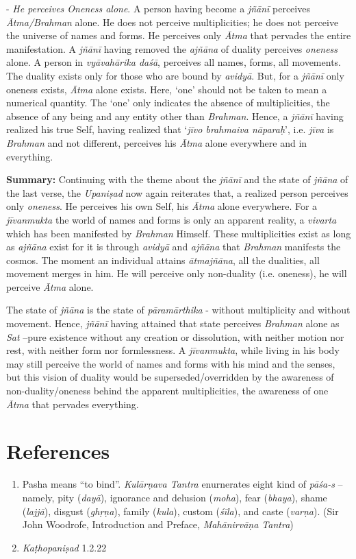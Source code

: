 - \emph{He perceives Oneness alone}. A person having become a \emph{jñānī} perceives \emph{Ātma/Brahman} alone. He does not perceive multiplicities; he does not perceive the universe of names and forms. He perceives only \emph{Ātma} that pervades the entire manifestation. A \emph{jñānī} having removed the \emph{ajñāna} of duality perceives \emph{oneness} alone. A person in \emph{vyāvahārika daśā}, perceives all names, forms, all movements. The duality exists only for those who are bound by \emph{avidyā}. But, for a \emph{jñānī} only oneness exists, \emph{Ātma} alone exists. Here, `one' should not be taken to mean a numerical quantity. The `one' only indicates the absence of multiplicities, the absence of any being and any entity other than \emph{Brahman}. Hence, a \emph{jñānī} having realized his true Self, having realized that `\emph{jīvo brahmaiva nāparaḥ}', i.e. \emph{jīva} is \emph{Brahman} and not different, perceives his \emph{Ātma} alone everywhere and in everything.

\textbf{Summary:} Continuing with the theme about the \emph{jñānī} and the state of \emph{jñāna} of the last verse, the \emph{Upaniṣad} now again reiterates that, a realized person perceives only \emph{oneness}. He perceives his own Self, his \emph{Ātma} alone everywhere. For a \emph{jīvanmukta} the world of names and forms is only an apparent reality, a \emph{vivarta} which has been manifested by \emph{Brahman} Himself. These multiplicities exist as long as \emph{ajñāna} exist for it is through \emph{avidyā} and \emph{ajñāna} that \emph{Brahman} manifests the cosmos. The moment an individual attains \emph{ātmajñāna}, all the dualities, all movement merges in him. He will perceive only non-duality (i.e. oneness), he will perceive \emph{Ātma} alone.

The state of \emph{jñāna} is the state of \emph{pāramārthika} - without multiplicity and without movement. Hence, \emph{jñānī} having attained that state perceives \emph{Brahman} alone as \emph{Sat} --pure existence without any creation or dissolution, with neither motion nor rest, with neither form nor formlessness. A \emph{jīvanmukta}, while living in his body may still perceive the world of names and forms with his mind and the senses, but this vision of duality would be superseded/overridden by the awareness of non-duality/oneness behind the apparent multiplicities, the awareness of one \emph{Ātma} that pervades everything.

\section*{References}

\begin{enumerate}
\itemsep=0pt
\item
  Pasha means ``to bind''. \emph{Kulārṇava Tantra} enurnerates eight kind of \emph{pāśa-s} -- namely, pity (\emph{dayā}), ignorance and delusion (\emph{moha}), fear (\emph{bhaya}), shame (\emph{lajjā}), disgust (\emph{ghṛṇa}), family (\emph{kula}), custom (\emph{śīla}), and caste (\emph{varṇa}). (Sir John Woodrofe, Introduction and Preface, \emph{Mahānirvāṇa Tantra})
\item
  \emph{Kaṭhopaniṣad} 1.2.22
\end{enumerate}

